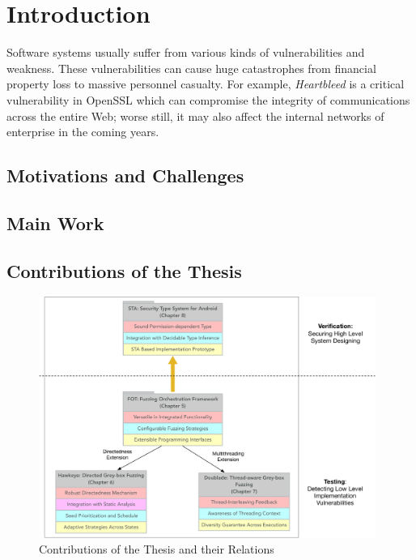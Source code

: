 
\chapter{Introduction} \label{ch:introduction}

Software systems usually suffer from various kinds of vulnerabilities and weakness. These vulnerabilities can cause huge catastrophes from financial property loss to massive personnel casualty. For example, \emph{Heartbleed} is a critical vulnerability in OpenSSL which can compromise the integrity of communications across the entire Web; worse still, it may also affect the internal networks of enterprise in the coming years. 


\section{Motivations and Challenges}

\section{Main Work}

\section{Contributions of the Thesis}

\begin{figure}[ht]
	\begin{center}
		\includegraphics[width=0.98\textwidth]{res/contributions}
		\caption{Contributions of the Thesis and their Relations}
		\label{fig:works}
	\end{center}
\end{figure}


